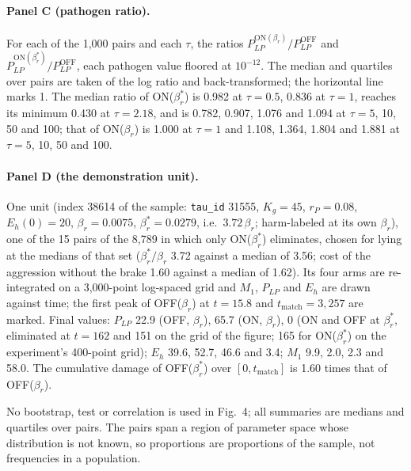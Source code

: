 \documentclass[11pt]{article}
\begin{document}
\paragraph{Panel C (pathogen ratio).} For each of the 1{,}000 pairs and each $\tau$, the ratios
$P_{LP}^{\mathrm{ON}(\beta_r)}/P_{LP}^{\mathrm{OFF}}$ and $P_{LP}^{\mathrm{ON}(\beta_r^{*})}/P_{LP}^{\mathrm{OFF}}$,
each pathogen value floored at $10^{-12}$. The median and quartiles over pairs are taken of the
log ratio and back-transformed; the horizontal line marks 1. The median ratio of ON($\beta_r^{*}$)
is 0.982 at $\tau = 0.5$, 0.836 at $\tau = 1$, reaches its minimum 0.430 at $\tau = 2.18$, and is
0.782, 0.907, 1.076 and 1.094 at $\tau = 5$, 10, 50 and 100; that of ON($\beta_r$) is 1.000 at
$\tau = 1$ and 1.108, 1.364, 1.804 and 1.881 at $\tau = 5$, 10, 50 and 100.

\paragraph{Panel D (the demonstration unit).} One unit (index 38614 of the sample:
\texttt{tau\_id} 31555, $K_g = 45$, $r_P = 0.08$, $E_h(0) = 20$, $\beta_r = 0.0075$,
$\beta_r^{*} = 0.0279$, i.e.\ $3.72\,\beta_r$; harm-labeled at its own $\beta_r$), one of the 15 pairs
of the 8{,}789 in which only ON($\beta_r^{*}$) eliminates, chosen for lying at the medians of that
set ($\beta_r^{*}/\beta_r$ 3.72 against a median of 3.56; cost of the aggression without the brake
1.60 against a median of 1.62). Its four arms
are re-integrated on a 3{,}000-point log-spaced grid and $M_1$, $P_{LP}$ and $E_h$ are drawn
against time; the first peak of OFF($\beta_r$) at $t = 15.8$ and $t_{\mathrm{match}} = 3{,}257$ are marked. Final
values: $P_{LP}$ 22.9 (OFF, $\beta_r$), 65.7 (ON, $\beta_r$), 0 (ON and OFF at $\beta_r^{*}$,
eliminated at $t = 162$ and 151 on the grid of the figure; 165 for ON($\beta_r^{*}$) on the
experiment's 400-point grid); $E_h$ 39.6, 52.7, 46.6 and 3.4; $M_1$ 9.9, 2.0, 2.3 and 58.0.
The cumulative damage of OFF($\beta_r^{*}$) over $[0, t_{\mathrm{match}}]$ is 1.60 times that of OFF($\beta_r$).

No bootstrap, test or correlation is used in Fig.~4; all summaries are medians and quartiles
over pairs. The pairs span a region of parameter space whose distribution is not known, so
proportions are proportions of the sample, not frequencies in a population.
\end{document}
